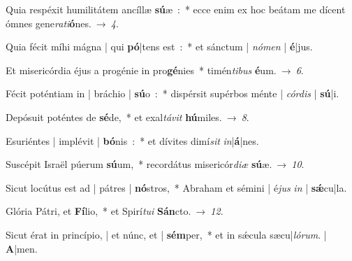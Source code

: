 ﻿\item Quia respéxit humilitátem ancíllæ \textbf{sú}æ~:~*
ecce enim ex hoc beátam me dícent ómnes gene\emph{ra}\emph{ti}\textbf{ó}nes.~→~\emph{4}.
\item Quia fécit míhi mágna | qui \textbf{pó}|tens est~:~*
et sánctum | \emph{nó}\-\emph{men} | \textbf{é}|jus.
\item Et misericórdia éjus a progénie in pro\textbf{gé}nies~*
timén\emph{ti}\-\emph{bus} \textbf{é}um.~→~\emph{6}.
\item Fécit poténtiam in | bráchio | \textbf{sú}o~:~*
dispérsit supérbos ménte | \emph{cór}\-\emph{dis} | \textbf{sú}|i.
\item Depósuit poténtes de \textbf{sé}de,~*
et exal\emph{tá}\-\emph{vit} \textbf{hú}miles.~→~\emph{8}.
\item Esuriéntes | implévit | \textbf{bó}nis~:~*
et dívites dimí\emph{sit} \emph{in}|\textbf{á}|nes.
\item Suscépit Israël púerum \textbf{sú}um,~*
recordátus misericór\emph{di}\-\emph{æ} \textbf{sú}æ.~→~\emph{10}.
\item Sicut locútus est ad | pátres | \textbf{nó}stros,~*
Abraham et sémini | é\emph{jus} \emph{in} | \textbf{sǽ}cu|la.
\item Glória Pátri, et \textbf{Fí}lio,~*
et Spirí\emph{tu}\-\emph{i} \textbf{Sán}cto.~→~\emph{12}.
\item Sicut érat in princípio, | et núnc, et | \textbf{sém}per,~*
et in sǽcula sæcu|\emph{ló}\-\emph{rum}. | \textbf{A}|men.
